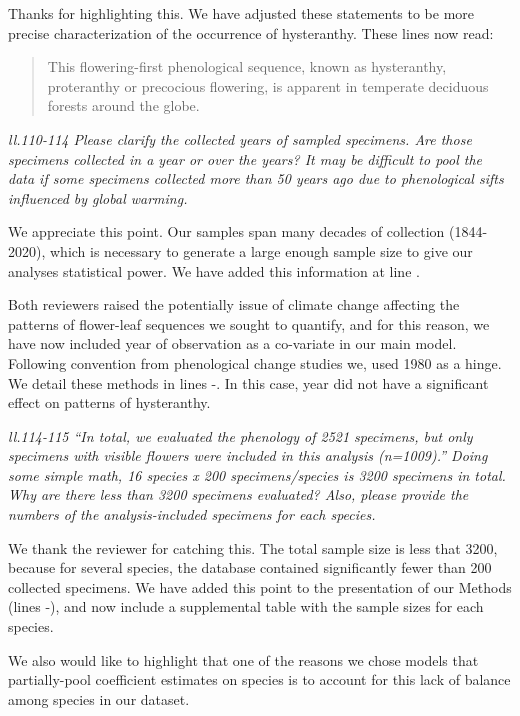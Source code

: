 \documentclass{article}[12pt]
\begin{document}
Thanks for highlighting this. We have adjusted these statements to be more precise characterization of the occurrence of hysteranthy. These lines now read:
\begin{quote} This flowering-first phenological sequence, known as hysteranthy, proteranthy or precocious flowering, is apparent in temperate deciduous forests around the globe. \end{quote}

\emph{ll.110-114 Please clarify the collected years of sampled specimens. Are those specimens collected in a year or over the years? It may be difficult to pool the data if some specimens collected more than 50 years ago due to phenological sifts influenced by global warming.}

We appreciate this point. Our samples span many decades of collection (1844-2020), which is necessary to generate a large enough sample size to give our analyses statistical power. We have added this information at line .

Both reviewers raised the potentially issue of climate change affecting the patterns of flower-leaf sequences we sought to quantify, and for this reason, we have now included year of observation as a co-variate in our main model. Following convention from phenological change studies we, used 1980 as a hinge. We detail these methods in lines -. In this case, year did not have a significant effect on patterns of hysteranthy.

\emph{ll.114-115 “In total, we evaluated the phenology of 2521 specimens, but only specimens with visible flowers were included in this analysis (n=1009).”
Doing some simple math, 16 species x 200 specimens/species is 3200 specimens in total. Why are there less than 3200 specimens evaluated? Also, please provide the numbers of the analysis-included specimens for each species.}

We thank the reviewer for catching this. The total sample size is less that 3200, because for several species, the database contained significantly fewer than 200 collected specimens. We have added this point to the presentation of our Methods (lines -), and now include a supplemental table with the sample sizes for each species. 

We also would like to highlight that one of the reasons we chose models that partially-pool coefficient estimates on species is to account for this lack of balance among species in our dataset.
\end{document}
